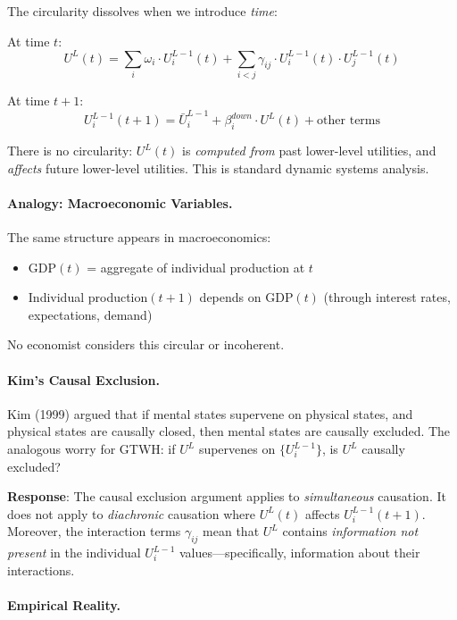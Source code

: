 \documentclass[12pt,a4paper]{article}
\begin{document}
The circularity dissolves when we introduce \textit{time}:

At time $t$:
\begin{equation}
U^L(t) = \sum_i \omega_i \cdot U^{L-1}_i(t) + \sum_{i<j} \gamma_{ij} \cdot U^{L-1}_i(t) \cdot U^{L-1}_j(t)
\end{equation}

At time $t+1$:
\begin{equation}
U^{L-1}_i(t+1) = \bar{U}^{L-1}_i + \beta^{down}_i \cdot U^L(t) + \text{other terms}
\end{equation}

There is no circularity: $U^L(t)$ is \textit{computed from} past lower-level 
utilities, and \textit{affects} future lower-level utilities. This is standard 
dynamic systems analysis.

\paragraph{Analogy: Macroeconomic Variables.}

The same structure appears in macroeconomics:
\begin{itemize}[nosep]
\item GDP$(t)$ = aggregate of individual production at $t$
\item Individual production$(t+1)$ depends on GDP$(t)$ (through interest rates, 
expectations, demand)
\end{itemize}

No economist considers this circular or incoherent.

\paragraph{Kim's Causal Exclusion.}

Kim (1999) argued that if mental states supervene on physical states, 
and physical states are causally closed, then mental states are causally 
excluded. The analogous worry for GTWH: if $U^L$ supervenes on $\{U^{L-1}_i\}$, 
is $U^L$ causally excluded?

\textbf{Response}: The causal exclusion argument applies to \textit{simultaneous} 
causation. It does not apply to \textit{diachronic} causation where $U^L(t)$ 
affects $U^{L-1}_i(t+1)$. Moreover, the interaction terms $\gamma_{ij}$ mean 
that $U^L$ contains \textit{information not present} in the individual $U^{L-1}_i$ 
values---specifically, information about their interactions.

\paragraph{Empirical Reality.}
\end{document}
